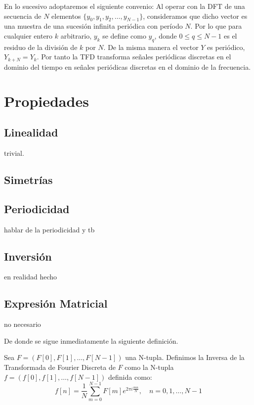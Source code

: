 \begin{observacion}
    En lo sucesivo adoptaremos el siguiente convenio:
    Al operar con la DFT de una secuencia de $N$ elementos  $\{y_0, y_1, y_2, \ldots, y_{N-1}\} $, consideramos que dicho vector es una muestra de una sucesión infinita periódica con período \( N \). Por lo que para cualquier entero \( k \) arbitrario, \( y_k \) se define como \( y_q \), donde \( 0 \leq q \leq N - 1 \) es el residuo de la división de \( k \) por \( N \). De la misma manera el vector $Y$ es periódico,  \( Y_{k+N} = Y_k \). Por tanto la TFD transforma señales periódicas discretas en el dominio del tiempo en señales periódicas discretas en el dominio de la frecuencia.
\end{observacion}


\section{Propiedades}

\subsection{Linealidad}
trivial.
\subsection{Simetrías}

\subsection{Periodicidad}
hablar de la periodicidad
y tb 
\subsection{Inversión}
en realidad hecho
\subsection{Expresión Matricial} no necesario



\noindent De donde se sigue inmediatamente la siguiente definición.

\begin{definicion}   
Sea $F = (F[0],F[1],\ldots,F[N-1])$ una N-tupla. Definimos la Inversa de la Transformada de Fourier Discreta de $F$ como la N-tupla $f = (f[0],f[1],\ldots,f[N-1])$ definida como:
\begin{equation}
    f[n] = \frac{1}{N}\sum_{m=0}^{N-1} F[m] e^{2\pi i \frac{mn}{N}}, \quad n = 0,1,\ldots,N-1
\end{equation}
\end{definicion}

